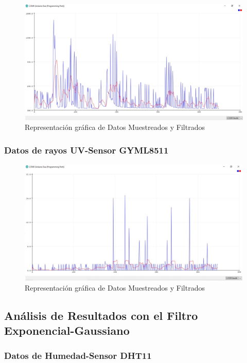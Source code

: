 \documentclass[10pt,a4paper]{article}
\begin{document}
\begin{multicols}{2}
\begin{itemize}
\begin{figure}[H]
\centering
\includegraphics[scale=0.30]{dianomq135.PNG}
\caption{Representación gráfica de Datos Muestreados y Filtrados}
\end{figure}

\subsubsection{Datos de rayos UV-Sensor GYML8511}

\begin{figure}[H]
\centering
\includegraphics[scale=0.30]{dianouv.PNG}
\caption{Representación gráfica de Datos Muestreados y Filtrados}
\end{figure}

\subsection{Análisis de Resultados con el Filtro Exponencial-Gaussiano}

\subsubsection{Datos de Humedad-Sensor DHT11}


\end{itemize}
\end{multicols}
\end{document}
